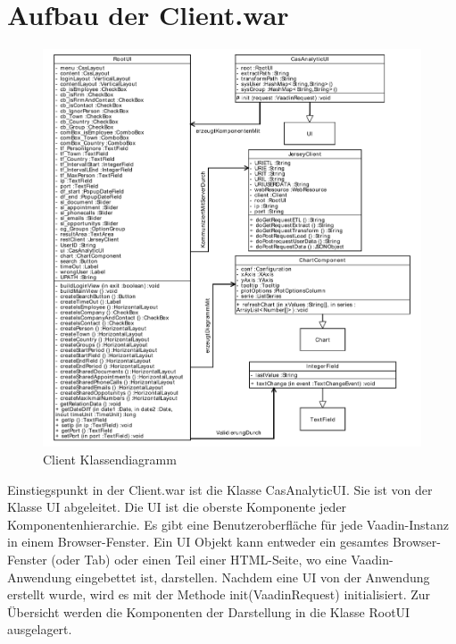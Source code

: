 \section{Aufbau der Client.war}
\label{ch:Umsetzung:sec:clientwar}

\begin{figure}[htbp]
\begin{center}
\includegraphics[width=1.0\textwidth]{pics/ClientKlassendiagramm.pdf}
\caption{Client Klassendiagramm}
\label{umsetzung_klassendiagramm_client}
\end{center}
\end{figure}

Einstiegspunkt in der Client.war ist die Klasse CasAnalyticUI. Sie ist von der Klasse UI abgeleitet. Die UI ist die oberste Komponente jeder Komponentenhierarchie. Es gibt eine Benutzeroberfläche für jede Vaadin-Instanz in einem Browser-Fenster. Ein UI Objekt kann entweder ein gesamtes Browser-Fenster (oder Tab) oder einen Teil einer HTML-Seite, wo eine Vaadin-Anwendung eingebettet ist, darstellen. Nachdem eine UI von der Anwendung erstellt wurde, wird es mit der Methode init(VaadinRequest) initialisiert. Zur Übersicht werden die Komponenten der Darstellung in die Klasse RootUI ausgelagert. 

